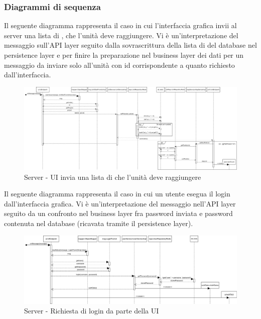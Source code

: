 		\newpage

		\begin{landscape}
			\subsubsection{Diagrammi di sequenza}
			Il seguente diagramma rappresenta il caso in cui l'interfaccia grafica invii al server una lista di , che l'unità deve raggiungere. Vi è un'interpretazione del messaggio sull'API layer seguito dalla sovrascrittura della lista di  del database nel persistence layer e per finire la preparazione nel business layer dei dati per un messaggio da inviare solo all'unità con id corrispondente a quanto richiesto dall'interfaccia.
			\begin{figure}[H]
				\centering
				\includegraphics[width=25.7cm]{img/server_seq1.png}
				\caption{Server - UI invia una lista di  che l'unità deve raggiungere}
			\end{figure}
		\end{landscape}

		\newpage

		\begin{landscape}
			Il seguente diagramma rappresenta il caso in cui un utente esegua il login dall'interfaccia grafica. Vi è un'interpretazione del messaggio nell'API layer seguito da un confronto nel business layer fra password inviata e password contenuta nel database (ricavata tramite il persistence layer).
			\begin{figure}[H]
				\centering
				\includegraphics[width=25.7cm]{img/server_seq2.png}
				\caption{Server - Richiesta di login da parte della UI}
			\end{figure}
		\end{landscape}


